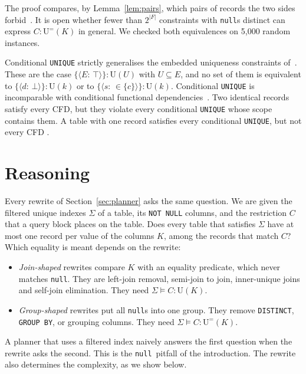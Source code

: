 \documentclass[conference]{IEEEtran}
\theoremstyle{definition}
\newcommand{\sql}[1]{\texttt{#1}}
\newcommand{\nul}{\texttt{null}}
\newcommand{\Sig}{\Sigma}
\newcommand{\U}[1]{\mathrm{U}(#1)}
\newcommand{\Ueq}[1]{\mathrm{U}^{=}(#1)}
\newcommand{\tpl}[1]{\ensuremath{\langle #1\rangle}}
\newif\ifextended
\begin{document}
\else
\noindent The proof compares, by Lemma~\ref{lem:pairs}, which pairs of records the two sides forbid~\cite{EXT}.
\fi
\noindent It is open whether fewer than $2^{|F|}$ constraints with \nul s distinct can express $C:\Ueq{K}$ in
general. We checked both equivalences on 5{,}000 random instances.

Conditional \sql{UNIQUE} strictly generalises the embedded uniqueness constraints of~\cite{WLL19}. These are the case
$\{\tpl{E{:}\,\top}\}:\U{U}$ with $U\subseteq E$, and no set of them is equivalent to $\{\tpl{d{:}\,\bot}\}:\U{k}$ or to
$\{\tpl{s{:}\,{\in}\{c\}}\}:\U{k}$. Conditional \sql{UNIQUE} is incomparable with conditional functional
dependencies~\cite{FGJK08}. Two identical records satisfy every CFD, but they violate every conditional \sql{UNIQUE} whose
scope contains them. A table with one record satisfies every conditional \sql{UNIQUE}, but not every CFD
\ifextended(Appendix~\ref{app:reason})\fi.


\section{Reasoning}\label{sec:reasoning}

Every rewrite of Section~\ref{sec:planner} asks the same question. We are given the filtered unique indexes $\Sig$ of
a table, its \sql{NOT NULL} columns, and the restriction $C$ that a query block places on the table. Does every table that
satisfies $\Sig$ have at most one record per value of the columns $K$, among the records that match $C$? Which equality
is meant depends on the rewrite:
\begin{itemize}
\item \emph{Join-shaped} rewrites compare $K$ with an equality predicate, which never matches \nul. They are left-join
  removal, semi-join to join, inner-unique joins and self-join elimination. They need $\Sig\models C:\U{K}$.
\item \emph{Group-shaped} rewrites put all \nul s into one group. They remove \sql{DISTINCT}, \sql{GROUP BY}, or
  grouping columns. They need $\Sig\models C:\Ueq{K}$.
\end{itemize}
A planner that uses a filtered index naively answers the first question when the rewrite asks the second. This is the \nul\ pitfall of the
introduction. The rewrite also determines the complexity, as we show below.
\end{document}
